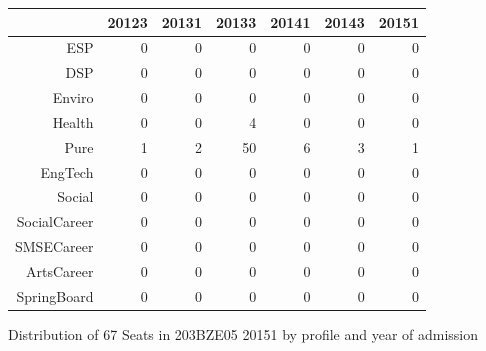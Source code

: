 \documentclass{article}\usepackage[]{graphicx}\usepackage[]{color}
\begin{document}
\begin{figure}[H]
\centering
\begin{tabular}{rrrrrrr}
  \hline
 & 20123 & 20131 & 20133 & 20141 & 20143 & 20151 \\ 
  \hline
ESP &   0 &   0 &   0 &   0 &   0 &   0 \\ 
  DSP &   0 &   0 &   0 &   0 &   0 &   0 \\ 
  Enviro &   0 &   0 &   0 &   0 &   0 &   0 \\ 
  Health &   0 &   0 &   4 &   0 &   0 &   0 \\ 
  Pure &   1 &   2 &  50 &   6 &   3 &   1 \\ 
  EngTech &   0 &   0 &   0 &   0 &   0 &   0 \\ 
  Social &   0 &   0 &   0 &   0 &   0 &   0 \\ 
  SocialCareer &   0 &   0 &   0 &   0 &   0 &   0 \\ 
  SMSECareer &   0 &   0 &   0 &   0 &   0 &   0 \\ 
  ArtsCareer &   0 &   0 &   0 &   0 &   0 &   0 \\ 
  SpringBoard &   0 &   0 &   0 &   0 &   0 &   0 \\ 
   \hline
\end{tabular}
\caption{Distribution of 67 Seats in 203BZE05 20151 by profile and year of admission} 
\end{figure}
\end{document}
